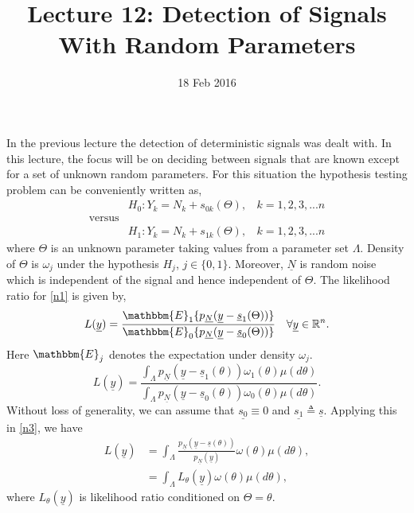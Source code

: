 \documentclass[a4paper,english,12pt]{article}
\title{Lecture 12: Detection of Signals With Random Parameters}
\date{18 Feb 2016}
\author{}
\begin{document}
\maketitle
In the previous lecture the detection of deterministic signals was dealt with. In this lecture, the focus will be on deciding between signals that are known except for a set of unknown random parameters. For this situation the hypothesis testing problem can be conveniently written as,
\begin{equation}
 \label{n1}
      \begin{aligned}
      & H_0 : Y_k=N_k+s_{0k}(\Theta) ,\ \ \ \ k=1,2,3,...n  \\
      \mbox{versus} & \\
      & H_1 : Y_k=N_k+s_{1k}(\Theta) ,\ \ \ \ k=1,2,3,...n
      \end{aligned}
 \end{equation}
 where $\Theta$ is an unknown parameter taking values from a parameter set $\Lambda$. Density of $\Theta$ is $\omega_j$ under the hypothesis $H_j$, $j\in \{0,1\}$. Moreover, $\underline{N}$ is random noise which is independent of the signal and hence independent of $\Theta$.
 The likelihood ratio for \eqref{n1} is given by,
 \begin{equation*}
 L(\underline{y})=\frac{\mathbbm{E}_1 \lbrace p_{\underline{N}}(\underline{y}-\underline{s}_1(\Theta))\rbrace}{\mathbbm{E}_0 \lbrace p_{\underline{N}}(\underline{y}-\underline{s}_0(\Theta))\rbrace}  \ \ \  \forall \underline{y}\in \R^ n.
 \end{equation*}
 Here $\mathbbm{E}_j$ denotes the expectation under density $\omega_j$. 
 \begin{equation}
 \label{n3}
 L(\underline{y})=\frac{\int_\Lambda  p_{\underline{N}}(\underline{y}-\underline{s}_1(\theta))\omega_1(\theta)\mu (d\theta)}{\int_\Lambda  p_{\underline{N}}(\underline{y}-\underline{s}_0(\theta))\omega_0(\theta)\mu (d\theta)}.
 \end{equation}
 Without loss of generality, we can assume that $\underline{s_0}\equiv 0$ and $\underline{s_1}\triangleq \underline{s}$. Applying this in \eqref{n3}, we have
\begin{align} 
 L(\underline{y})&=\int_\Lambda \frac{ p_{\underline{N}}(\underline{y}-\underline{s}(\theta))}{p_{\underline{N}}(\underline{y})}\omega(\theta)\mu (d\theta), \\ 
  \label{n5}
 &=\int_\Lambda L_\theta(\underline{y})\omega(\theta)\mu (d\theta),
\end{align} 
where $L_\theta(\underline{y})$ is likelihood ratio conditioned on $\Theta = \theta$.
\end{document}
